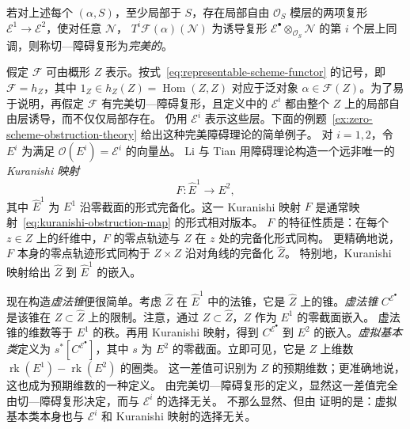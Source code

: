 若对上述每个 $(\alpha,S)$，至少局部于 $S$，存在局部自由 $\mathcal O_S$ 模层的两项复形
$\mathcal E^1\to\mathcal E^2$，使对任意 $\mathcal N$，
$T^i\mathcal F(\alpha)(\mathcal N)$ 为诱导复形
$\mathcal E^\bullet\otimes_{\mathcal O_S}\mathcal N$ 的第 $i$ 个层上同调，则称切—障碍复形为\emph{完美的}。

假定 $\mathcal F$ 可由概形 $Z$ 表示。按式~\eqref{eq:representable-scheme-functor} 的记号，即
$\mathcal F=h_Z$，其中 $1_Z\in h_Z(Z)=\operatorname{Hom}(Z,Z)$ 对应于泛对象
$\alpha\in\mathcal F(Z)$。为了易于说明，再假定 $\mathcal F$ 有完美切—障碍复形，且定义中的
$\mathcal E^i$ 都由整个 $Z$ 上的局部自由层诱导，而不仅仅局部存在。
仍用 $\mathcal E^i$ 表示这些层。下面的例题~\ref{ex:zero-scheme-obstruction-theory} 给出这种完美障碍理论的简单例子。
对 $i=1,2$，令 $E^i$ 为满足 $\mathcal O(E^i)=\mathcal E^i$ 的向量丛。
Li 与 Tian 用障碍理论构造一个远非唯一的 \emph{Kuranishi 映射}
\[
F:\widehat E^1\longrightarrow E^2,
\]
其中 $\widehat E^1$ 为 $E^1$ 沿零截面的形式完备化。这一 Kuranishi 映射 $F$ 是通常映射~\eqref{eq:kuranishi-obstruction-map} 的形式相对版本。
$F$ 的特征性质是：在每个 $z\in Z$ 上的纤维中，$F$ 的零点轨迹与 $Z$ 在 $z$ 处的完备化形式同构。
更精确地说，$F$ 本身的零点轨迹形式同构于 $Z\times Z$ 沿对角线的完备化 $\widehat Z$。
特别地，Kuranishi 映射给出 $\widehat Z$ 到 $\widehat E^1$ 的嵌入。

现在构造\emph{虚法锥}便很简单。考虑 $\widehat Z$ 在 $\widehat E^1$ 中的法锥，它是
$\widehat Z$ 上的锥。\emph{虚法锥} $C^{\mathcal E^\bullet}$ 是该锥在
$Z\subset\widehat Z$ 上的限制。注意，通过 $Z\subset\widehat Z$，$Z$ 作为 $E^1$ 的零截面嵌入。
虚法锥的维数等于 $E^1$ 的秩。再用 Kuranishi 映射，得到
$C^{\mathcal E^\bullet}$ 到 $E^2$ 的嵌入。\emph{虚拟基本类}定义为
$s^*[C^{\mathcal E^\bullet}]$，其中 $s$ 为 $E^2$ 的零截面。立即可见，它是 $Z$ 上维数
$\operatorname{rk}(E^1)-\operatorname{rk}(E^2)$ 的圈类。
这一差值可识别为 $Z$ 的预期维数；更准确地说，这也成为预期维数的一种定义。
由完美切—障碍复形的定义，显然这一差值完全由切—障碍复形决定，而与 $\mathcal E^i$ 的选择无关。
不那么显然、但由  证明的是：虚拟基本类本身也与 $\mathcal E^i$ 和 Kuranishi 映射的选择无关。

